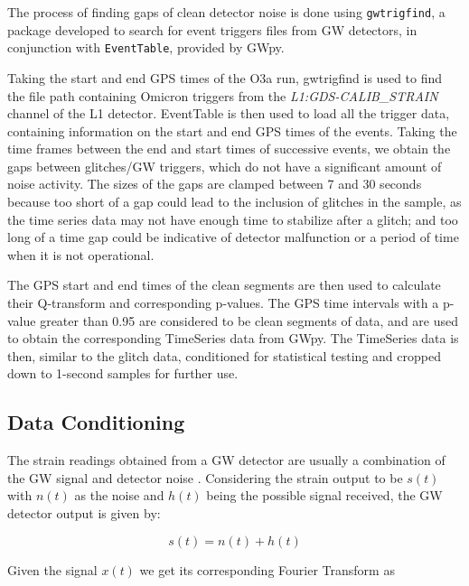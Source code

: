 \documentclass[12pt]{article}
\begin{document}
\noindent The process of finding gaps of clean detector noise is done using \texttt{gwtrigfind}, a package developed to search for event triggers files from GW detectors, in conjunction with \texttt{EventTable}, provided by GWpy.

\medskip
\noindent Taking the start and end GPS times of the O3a run, gwtrigfind is used to find the file path containing Omicron triggers from the \textit{L1:GDS-CALIB\_STRAIN} channel of the L1 detector. EventTable is then used to load all the trigger data, containing information on the start and end GPS times of the events. Taking the time frames between the end and start times of successive events, we obtain the gaps between glitches/GW triggers, which do not have a significant amount of noise activity. The sizes of the gaps are clamped between 7 and 30 seconds because too short of a gap could lead to the inclusion of glitches in the sample, as the time series data may not have enough time to stabilize after a glitch; and too long of a time gap could be indicative of detector malfunction or a period of time when it is not operational.

\medskip
\noindent The GPS start and end times of the clean segments are then used to calculate their Q-transform and corresponding p-values. The GPS time intervals with a p-value greater than 0.95 are considered to be clean segments of data, and are used to obtain the corresponding TimeSeries data from GWpy. The TimeSeries data is then, similar to the glitch data, conditioned for statistical testing and cropped down to 1-second samples for further use.


\subsection{Data Conditioning}

\noindent The strain readings obtained from a GW detector are usually a combination of the GW signal and detector noise \cite{cutler_gravitational_1994, moore_gravitational-wave_2015, Li:2013lza}. Considering the strain output to be $s(t)$ with $n(t)$ as the noise and $h(t)$ being the possible signal received, the GW detector output is given by:

\begin{equation}
    s(t) = n(t) + h(t)
    \label{eq:strain_output}
\end{equation}

\noindent Given the signal $x(t)$ we get its corresponding Fourier Transform as
\end{document}
